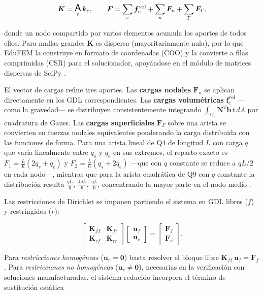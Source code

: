\begin{equation}
\bm{K} = \operatorname*{\text{\Large\textsf{A}}}_{e} \bm{k}_e, \qquad
\bm{F} = \sum_e \bm{f}_e^{\text{vol}} + \sum_n \bm{F}_n + \sum_\Gamma \bm{F}_\Gamma,
\label{eq:ensamblaje}
\end{equation}

donde un nodo compartido por varios elementos acumula los aportes de todos ellos. Para mallas grandes $\bm{K}$ es dispersa (mayoritariamente nula), por lo que EduFEM la construye en formato de coordenadas (COO) y la convierte a filas comprimidas (CSR) para el solucionador, apoyándose en el módulo de matrices dispersas de SciPy \autocite[p.~265]{virtanen2020scipy}.

El vector de cargas reúne tres aportes. Las \textbf{cargas nodales} $\bm{F}_n$ se aplican directamente en los GDL correspondientes. Las \textbf{cargas volumétricas} $\bm{f}_e^{\text{vol}}$ —como la gravedad— se distribuyen consistentemente integrando $\int_{\Omega_e} \bm{N}^T \bm{b}\, t\, dA$ por cuadratura de Gauss. Las \textbf{cargas superficiales} $\bm{F}_\Gamma$ sobre una arista se convierten en fuerzas nodales equivalentes ponderando la carga distribuida con las funciones de forma. Para una arista lineal de Q4 de longitud $L$ con carga $q$ que varía linealmente entre $q_s$ y $q_e$ en sus extremos, el reparto exacto es $F_1 = \tfrac{L}{6}(2q_s + q_e)$ y $F_2 = \tfrac{L}{6}(q_s + 2q_e)$ —que con $q$ constante se reduce a $qL/2$ en cada nodo—, mientras que para la arista cuadrática de Q9 con $q$ constante la distribución resulta $\tfrac{qL}{6},\,\tfrac{4qL}{6},\,\tfrac{qL}{6}$, concentrando la mayor parte en el nodo medio \autocite[p.~113]{cook2002concepts}.

Las restricciones de Dirichlet se imponen partiendo el sistema en GDL libres ($f$) y restringidos ($r$):

\begin{equation}
\begin{bmatrix} \bm{K}_{ff} & \bm{K}_{fr} \\ \bm{K}_{rf} & \bm{K}_{rr} \end{bmatrix}
\begin{bmatrix} \bm{u}_f \\ \bm{u}_r \end{bmatrix}
=
\begin{bmatrix} \bm{F}_f \\ \bm{F}_r \end{bmatrix}.
\label{eq:particion}
\end{equation}

Para \emph{restricciones homogéneas} ($\bm{u}_r = \bm{0}$) basta resolver el bloque libre $\bm{K}_{ff}\,\bm{u}_f = \bm{F}_f$. Para \emph{restricciones no homogéneas} ($\bm{u}_r \neq \bm{0}$), necesarias en la verificación con soluciones manufacturadas, el sistema reducido incorpora el término de sustitución estática


